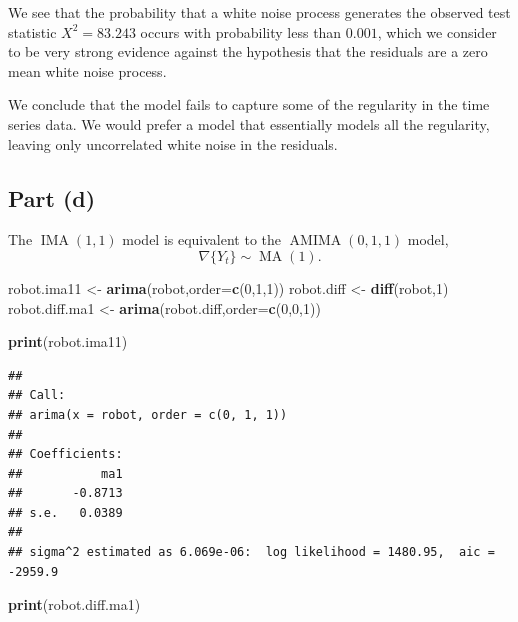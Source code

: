 \documentclass[
]{article}
\newenvironment{Shaded}{\begin{snugshade}}{\end{snugshade}}
\newcommand{\AttributeTok}[1]{\textcolor[rgb]{0.13,0.29,0.53}{#1}}
\newcommand{\DecValTok}[1]{\textcolor[rgb]{0.00,0.00,0.81}{#1}}
\newcommand{\FunctionTok}[1]{\textcolor[rgb]{0.13,0.29,0.53}{\textbf{#1}}}
\newcommand{\NormalTok}[1]{#1}
\newcommand{\OtherTok}[1]{\textcolor[rgb]{0.56,0.35,0.01}{#1}}
\begin{document}
We see that the probability that a white noise process generates the
observed test statistic \(X^2 = 83.243\) occurs with probability less
than \(0.001\), which we consider to be very strong evidence against the
hypothesis that the residuals are a zero mean white noise process.

We conclude that the model fails to capture some of the regularity in
the time series data. We would prefer a model that essentially models
all the regularity, leaving only uncorrelated white noise in the
residuals.

\hypertarget{part-d}{%
\subsection{Part (d)}\label{part-d}}


The \(\operatorname{IMA}(1,1)\) model is equivalent to the
\(\operatorname{AMIMA}(0,1,1)\) model, \[
   \nabla \{Y_t\} \sim \operatorname{MA}(1).
\]

\begin{Shaded}
\begin{Highlighting}[]
\NormalTok{robot.ima11 }\OtherTok{\textless{}{-}} \FunctionTok{arima}\NormalTok{(robot,}\AttributeTok{order=}\FunctionTok{c}\NormalTok{(}\DecValTok{0}\NormalTok{,}\DecValTok{1}\NormalTok{,}\DecValTok{1}\NormalTok{))}
\NormalTok{robot.diff }\OtherTok{\textless{}{-}} \FunctionTok{diff}\NormalTok{(robot,}\DecValTok{1}\NormalTok{)}
\NormalTok{robot.diff.ma1 }\OtherTok{\textless{}{-}} \FunctionTok{arima}\NormalTok{(robot.diff,}\AttributeTok{order=}\FunctionTok{c}\NormalTok{(}\DecValTok{0}\NormalTok{,}\DecValTok{0}\NormalTok{,}\DecValTok{1}\NormalTok{))}

\FunctionTok{print}\NormalTok{(robot.ima11)}
\end{Highlighting}
\end{Shaded}

\begin{verbatim}
## 
## Call:
## arima(x = robot, order = c(0, 1, 1))
## 
## Coefficients:
##           ma1
##       -0.8713
## s.e.   0.0389
## 
## sigma^2 estimated as 6.069e-06:  log likelihood = 1480.95,  aic = -2959.9
\end{verbatim}

\begin{Shaded}
\begin{Highlighting}[]
\FunctionTok{print}\NormalTok{(robot.diff.ma1)}
\end{Highlighting}
\end{Shaded}
\end{document}
